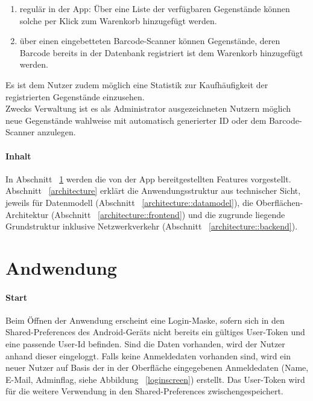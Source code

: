 \documentclass{scrartcl}
\begin{document}
	\begin{enumerate}
		\item regulär in der App: Über eine Liste der verfügbaren Gegenstände können solche per Klick zum Warenkorb hinzugefügt werden.

		\item über einen eingebetteten Barcode-Scanner können Gegenstände, deren Barcode bereits in der Datenbank registriert ist dem Warenkorb hinzugefügt werden.
	\end{enumerate}

	Es ist dem Nutzer zudem möglich eine Statistik zur Kaufhäufigkeit der registrierten Gegenstände einzusehen. \\
	Zwecks Verwaltung ist es als Administrator ausgezeichneten Nutzern möglich neue Gegenstände wahlweise mit automatisch generierter ID oder dem Barcode-Scanner anzulegen.

	\paragraph*{Inhalt}
	In Abschnitt ~\ref{features} werden die von der App bereitgestellten Features vorgestellt. Abschnitt ~\ref{architecture} erklärt die Anwendungsstruktur aus technischer Sicht, jeweils für Datenmodell (Abschnitt ~\ref{architecture::datamodel}), die Oberflächen-Architektur (Abschnitt ~\ref{architecture::frontend}) und die zugrunde liegende Grundstruktur inklusive Netzwerkverkehr (Abschnitt ~\ref{architecture::backend}).


	\section{Andwendung} \label{features}
	\paragraph*{Start}
	Beim Öffnen der Anwendung erscheint eine Login-Maske, sofern sich in den Shared-Preferences des Android-Geräts nicht bereits ein gültiges User-Token und eine passende User-Id befinden. Sind die Daten vorhanden, wird der Nutzer anhand dieser eingeloggt. Falls keine Anmeldedaten vorhanden sind, wird ein neuer Nutzer auf Basis der in der Oberfläche eingegebenen Anmeldedaten (Name, E-Mail, Adminflag, siehe Abbildung ~\ref{loginscreen}) erstellt. Das User-Token wird für die weitere Verwendung in den Shared-Preferences zwischengespeichert.
\end{document}

